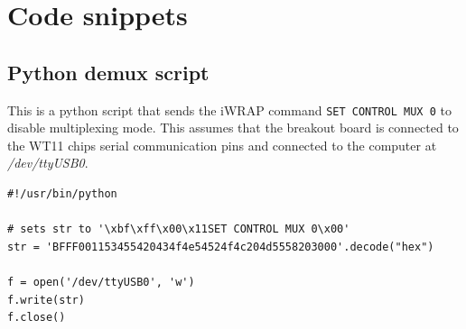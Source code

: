 \documentclass[a4paper, oneside, final]{memoir}
\begin{document}

\chapter{Code snippets}

\section{Python demux script}
\label{sec:python-demux-script}

This is a python script that sends the iWRAP command \texttt{SET CONTROL MUX 0}
to disable multiplexing mode. This assumes that the breakout board is connected
to the WT11 chips serial communication pins and connected to the computer at
\textit{/dev/ttyUSB0}.

\begin{verbatim}
#!/usr/bin/python

# sets str to '\xbf\xff\x00\x11SET CONTROL MUX 0\x00'
str = 'BFFF001153455420434f4e54524f4c204d5558203000'.decode("hex")

f = open('/dev/ttyUSB0', 'w')
f.write(str)
f.close()
\end{verbatim}
\end{document}
